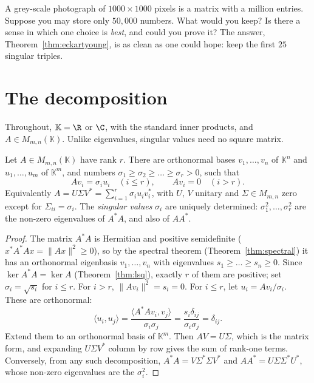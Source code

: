 \begin{think}
A grey-scale photograph of $1000\times1000$ pixels is a matrix with a million entries. Suppose you may store only
$50{,}000$ numbers. What would you keep? Is there a sense in which one choice is \emph{best}, and could you prove it? The
answer, Theorem~\ref{thm:eckartyoung}, is as clean as one could hope: keep the first $25$ singular triples.
\end{think}

\section{The decomposition}

Throughout, $\mathbb K=\R$ or $\C$, with the standard inner products, and $A\in M_{m,n}(\mathbb K)$. Unlike eigenvalues,
singular values need no square matrix.

\begin{theorem}\label{thm:svd}
Let $A\in M_{m,n}(\mathbb K)$ have rank $r$. There are orthonormal bases $v_1,\dots,v_n$ of $\mathbb K^n$ and
$u_1,\dots,u_m$ of $\mathbb K^m$, and numbers $\sigma_1\ge\sigma_2\ge\dots\ge\sigma_r>0$, such that
\[
Av_i=\sigma_iu_i\quad(i\le r),\qquad Av_i=0\quad(i>r).
\]
Equivalently $A=U\Sigma V^*=\sum_{i=1}^r\sigma_iu_iv_i^*$, with $U$, $V$ unitary and $\Sigma\in M_{m,n}$ zero except for
$\Sigma_{ii}=\sigma_i$. The \emph{singular values} $\sigma_i$ are uniquely determined: $\sigma_1^2,\dots,\sigma_r^2$ are the
non-zero eigenvalues of $A^*A$, and also of $AA^*$.
\end{theorem}
\begin{proof}
The matrix $A^*A$ is Hermitian and positive semidefinite ($x^*A^*Ax=\|Ax\|^2\ge0$), so by the spectral theorem
(Theorem~\ref{thm:spectral}) it has an orthonormal eigenbasis $v_1,\dots,v_n$ with eigenvalues $s_1\ge\dots\ge s_n\ge0$.
Since $\ker A^*A=\ker A$ (Theorem~\ref{thm:lsq}), exactly $r$ of them are positive; set $\sigma_i=\sqrt{s_i}$ for $i\le r$.
For $i>r$, $\|Av_i\|^2=s_i=0$. For $i\le r$, let $u_i=Av_i/\sigma_i$. These are orthonormal:
\[
\langle u_i,u_j\rangle=\frac{\langle A^*Av_i,v_j\rangle}{\sigma_i\sigma_j}=\frac{s_i\delta_{ij}}{\sigma_i\sigma_j}=\delta_{ij}.
\]
Extend them to an orthonormal basis of $\mathbb K^m$. Then $AV=U\Sigma$, which is the matrix form, and expanding $U\Sigma V^*$
column by row gives the sum of rank-one terms. Conversely, from any such decomposition, $A^*A=V\Sigma^*\Sigma V^*$ and
$AA^*=U\Sigma\Sigma^*U^*$, whose non-zero eigenvalues are the $\sigma_i^2$.
\end{proof}

